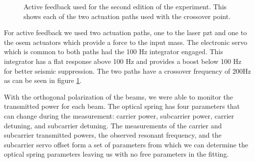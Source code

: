 \begin{figure}
\centering
  \caption[Active Feedback Control for 2nd Edition]{
    Active feedback used for the second edition of the experiment.
    This shows each of the two actuation paths used with the
    crossover point.
    }
  \label{fig:servoactuation}
\end{figure}


For active feedback we used two actuation paths, one to the laser \ac{pzt} and
one to the \ac{osem} actuators which provide a force to the input mass.
The electronic servo which is common to both paths had the 100 Hz integrator
engaged.
This integrator has a flat response above 100 Hz and provides a boost below
100 Hz for better seismic suppression.
The two paths have a crossover frequency of 200Hz as can be seen in figure
\ref{fig:servoactuation}.


With the orthogonal polarization of the beams, we were able to monitor the
transmitted power for each beam.
The optical spring has four parameters that can change during the
measurement: carrier power, subcarrier power, carrier detuning, and subcarrier
detuning. The measurements of the carrier and subcarrier transmitted powers,
the observed resonant frequency, and the subcarrier servo offset form a set
of parameters from which we can determine the optical spring parameters leaving
us with no free parameters in the fitting.

